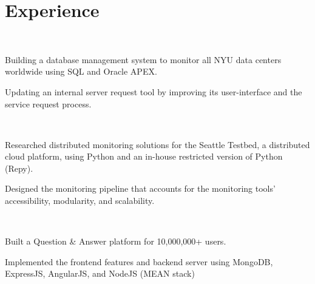 \section{Experience}

\\
\vspace{0.9em} %
\begin{tightemize}
\item Building a database management system to monitor all NYU data centers worldwide using SQL and Oracle APEX.
\item Updating an internal server request tool by improving its user-interface and the service request process.
\end{tightemize}
\sectionsep

 \\
\begin{tightemize}
\item Researched distributed monitoring solutions for the Seattle Testbed, a distributed cloud platform, using Python and an in-house restricted version of Python (Repy).
\item Designed the monitoring pipeline that accounts for the monitoring tools' accessibility, modularity, and scalability.
\end{tightemize}
\sectionsep

 \\
\begin{tightemize}
\item Built a Question \& Answer platform for 10,000,000+ users.
\item Implemented the frontend features and backend server using MongoDB, ExpressJS, AngularJS, and NodeJS (MEAN stack)
\end{tightemize}
\sectionsep


